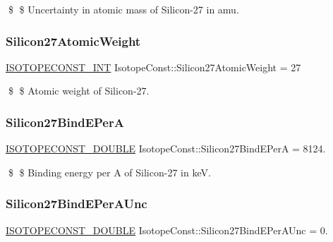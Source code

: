 \$ \$ Uncertainty in atomic mass of Silicon-\/27 in amu. \mbox{\label{group___isotope_const-_silicon-_si27_ga209fae511405f001dcd3121ee442106f}} 
\subsubsection{\texorpdfstring{Silicon27\+Atomic\+Weight}{Silicon27AtomicWeight}}
{\footnotesize\ttfamily \mbox{\hyperlink{group___isotope_const-_macros_ga5f18360b3e99483a35c32d789e62621c}{I\+S\+O\+T\+O\+P\+E\+C\+O\+N\+S\+T\+\_\+\+I\+NT}} Isotope\+Const\+::\+Silicon27\+Atomic\+Weight = 27}

\$ \$ Atomic weight of Silicon-\/27. \mbox{\label{group___isotope_const-_silicon-_si27_ga2293fe8eb95c1435714a0099a5347c0a}} 
\subsubsection{\texorpdfstring{Silicon27\+Bind\+E\+PerA}{Silicon27BindEPerA}}
{\footnotesize\ttfamily \mbox{\hyperlink{group___isotope_const-_macros_ga8f45a7272ce02c0b4c65c44636ed719a}{I\+S\+O\+T\+O\+P\+E\+C\+O\+N\+S\+T\+\_\+\+D\+O\+U\+B\+LE}} Isotope\+Const\+::\+Silicon27\+Bind\+E\+PerA = 8124.}

\$ \$ Binding energy per A of Silicon-\/27 in keV. \mbox{\label{group___isotope_const-_silicon-_si27_gacd9180126bceafca0b45a9ec9d5fd776}} 
\subsubsection{\texorpdfstring{Silicon27\+Bind\+E\+Per\+A\+Unc}{Silicon27BindEPerAUnc}}
{\footnotesize\ttfamily \mbox{\hyperlink{group___isotope_const-_macros_ga8f45a7272ce02c0b4c65c44636ed719a}{I\+S\+O\+T\+O\+P\+E\+C\+O\+N\+S\+T\+\_\+\+D\+O\+U\+B\+LE}} Isotope\+Const\+::\+Silicon27\+Bind\+E\+Per\+A\+Unc = 0.}

